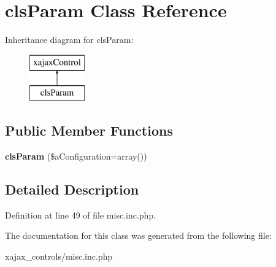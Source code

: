 \hypertarget{classclsParam}{
\section{clsParam Class Reference}
\label{classclsParam}
}
Inheritance diagram for clsParam:\begin{figure}[H]
\begin{center}
\leavevmode
\includegraphics[height=2.000000cm]{classclsParam}
\end{center}
\end{figure}
\subsection*{Public Member Functions}
\begin{DoxyCompactItemize}
\item 
\hypertarget{classclsParam_a5c7634cb36819d00d3577ac5fda93200}{
{\bfseries clsParam} (\$aConfiguration=array())}
\label{classclsParam_a5c7634cb36819d00d3577ac5fda93200}

\end{DoxyCompactItemize}


\subsection{Detailed Description}


Definition at line 49 of file misc.inc.php.



The documentation for this class was generated from the following file:\begin{DoxyCompactItemize}
\item 
xajax\_\-controls/misc.inc.php\end{DoxyCompactItemize}
